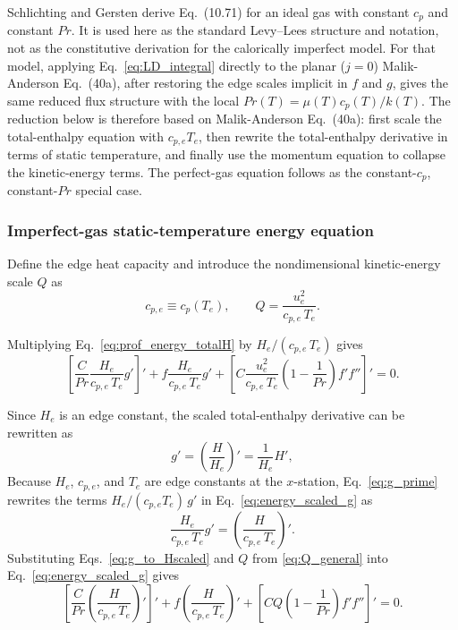 \documentclass[11pt]{article}
\newcommand{\MA}{Malik-Anderson}
\newcommand{\ue}{u_e}
\newcommand{\Te}{T_e}
\newcommand{\cpe}{c_{p,e}}
\begin{document}
Schlichting and Gersten derive Eq.~(10.71) for an ideal gas with constant \(c_p\) and constant \(Pr\). It is used here as the standard Levy--Lees structure and notation, not as the constitutive derivation for the calorically imperfect model. For that model, applying Eq.~\eqref{eq:LD_integral} directly to the planar (\(j=0\)) \MA{} Eq.~(40a), after restoring the edge scales implicit in \(f\) and \(g\), gives the same reduced flux structure with the local \(Pr(T)=\mu(T)c_p(T)/k(T)\). The reduction below is therefore based on \MA{} Eq.~(40a): first scale the total-enthalpy equation with \(\cpe\Te\), then rewrite the total-enthalpy derivative in terms of static temperature, and finally use the momentum equation to collapse the kinetic-energy terms. The perfect-gas equation follows as the constant-\(c_p\), constant-\(Pr\) special case.

\subsubsection{Imperfect-gas static-temperature energy equation}
\label{subsubsec:derv_imperfect_energy_similarity}

Define the edge heat capacity and introduce the nondimensional kinetic-energy scale \(Q\) as
\begin{equation}
  \cpe \equiv c_p(\Te),
  \qquad
  Q=\frac{\ue^2}{\cpe\,\Te}.
  \label{eq:Q_general}
\end{equation}

Multiplying Eq.~\eqref{eq:prof_energy_totalH} by \(H_e/(\cpe\,\Te)\) gives
\begin{equation}
  \left[
    \frac{C}{Pr}
    \frac{H_e}{\cpe\,\Te}g'
  \right]'
  +
  f\frac{H_e}{\cpe\,\Te}g'
  +
  \left[
    C\frac{\ue^2}{\cpe\,\Te}
    \left(1-\frac{1}{Pr}\right)f'f''
  \right]'=0.
  \label{eq:energy_scaled_g}
\end{equation}

Since \(H_e\) is an edge constant, the scaled total-enthalpy derivative can be rewritten as
\begin{equation}
  g'=\left(\frac{H}{H_e}\right)'=\frac{1}{H_e}H',
  \label{eq:g_prime}
\end{equation}
Because \(H_e\), \(\cpe\), and \(\Te\) are edge constants at the \(x\)-station, Eq.~\eqref{eq:g_prime} rewrites the terms \(H_e/(\cpe\Te)\,g'\) in Eq.~\eqref{eq:energy_scaled_g} as
\begin{equation}
  \frac{H_e}{\cpe\,\Te}g'
  =
  \left(\frac{H}{\cpe\,\Te}\right)'.
  \label{eq:g_to_Hscaled}
\end{equation}
Substituting Eqs.~\eqref{eq:g_to_Hscaled} and \(Q\) from \eqref{eq:Q_general} into Eq.~\eqref{eq:energy_scaled_g} gives
\begin{equation}
  \left[
    \frac{C}{Pr}
    \left(\frac{H}{\cpe\,\Te}\right)'
  \right]'
  +
  f
  \left(\frac{H}{\cpe\,\Te}\right)'
  +
  \left[
    CQ\left(1-\frac{1}{Pr}\right)f'f''
  \right]'=0.
  \label{eq:energy_scaled_H}
\end{equation}
\end{document}
